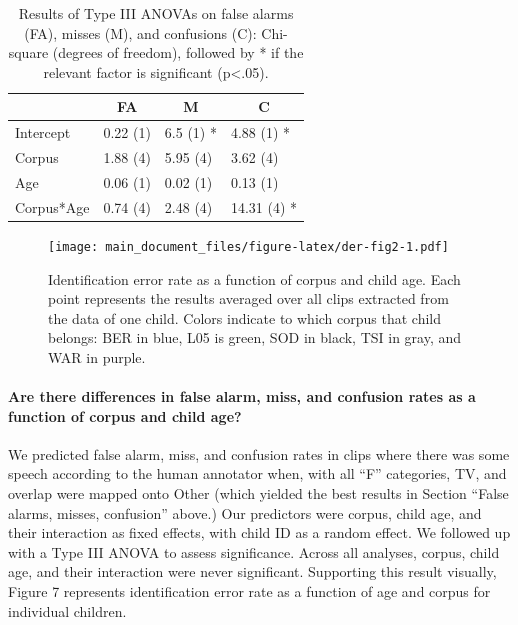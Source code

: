 \documentclass[english,table,man,floatsintext]{apa6}
\let\oldparagraph\paragraph
\renewcommand{\paragraph}[1]{\oldparagraph{#1}\mbox{}}
\begin{document}
\begin{table}[tbp]

\begin{center}
\begin{threeparttable}

\caption{\label{tab:anovatab}Results of Type III ANOVAs on false alarms (FA), misses (M), and confusions (C): Chi-square (degrees of freedom), followed by * if the relevant factor is significant (p<.05).}

\begin{tabular}{llll}
\toprule
 & \multicolumn{1}{c}{FA} & \multicolumn{1}{c}{M} & \multicolumn{1}{c}{C}\\
\midrule
Intercept & 0.22 (1) & 6.5 (1) * & 4.88 (1) *\\
Corpus & 1.88 (4) & 5.95 (4) & 3.62 (4)\\
Age & 0.06 (1) & 0.02 (1) & 0.13 (1)\\
Corpus*Age & 0.74 (4) & 2.48 (4) & 14.31 (4) *\\
\bottomrule
\end{tabular}

\end{threeparttable}
\end{center}

\end{table}

\begin{figure}
\centering
\texttt{[image: main\_document\_files/figure-latex/der-fig2-1.pdf]}
\caption{\label{fig:der-fig2}Identification error rate as a function of
corpus and child age. Each point represents the results averaged over
all clips extracted from the data of one child. Colors indicate to which
corpus that child belongs: BER in blue, L05 is green, SOD in black, TSI
in gray, and WAR in purple.}
\end{figure}

\paragraph{Are there differences in false alarm, miss, and confusion
rates as a function of corpus and child
age?}\label{are-there-differences-in-false-alarm-miss-and-confusion-rates-as-a-function-of-corpus-and-child-age}

We predicted false alarm, miss, and confusion rates in clips where there
was some speech according to the human annotator when, with all
\enquote{F} categories, TV, and overlap were mapped onto Other (which
yielded the best results in Section \enquote{False alarms, misses,
confusion} above.) Our predictors were corpus, child age, and their
interaction as fixed effects, with child ID as a random effect. We
followed up with a Type III ANOVA to assess significance. Across all
analyses, corpus, child age, and their interaction were never
significant. Supporting this result visually, Figure 7 represents
identification error rate as a function of age and corpus for individual
children.
\end{document}
